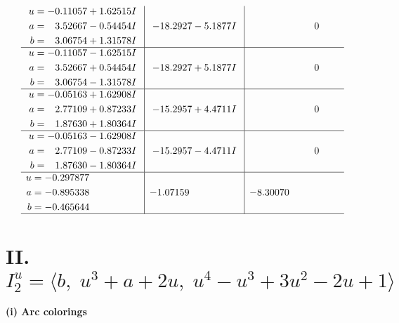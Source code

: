 \documentclass[1p]{elsarticle_modified}
\theoremstyle{definition}
\begin{document}
$$\begin{array}{c|c|c}
\begin{aligned}
u &= -0.11057 + 1.62515 I \\
a &= \phantom{-}3.52667 - 0.54454 I \\
b &= \phantom{-}3.06754 + 1.31578 I\end{aligned}
 & -18.2927 - 5.1877 I & \phantom{-0.000000 } 0 \\ \hline\begin{aligned}
u &= -0.11057 - 1.62515 I \\
a &= \phantom{-}3.52667 + 0.54454 I \\
b &= \phantom{-}3.06754 - 1.31578 I\end{aligned}
 & -18.2927 + 5.1877 I & \phantom{-0.000000 } 0 \\ \hline\begin{aligned}
u &= -0.05163 + 1.62908 I \\
a &= \phantom{-}2.77109 + 0.87233 I \\
b &= \phantom{-}1.87630 + 1.80364 I\end{aligned}
 & -15.2957 + 4.4711 I & \phantom{-0.000000 } 0 \\ \hline\begin{aligned}
u &= -0.05163 - 1.62908 I \\
a &= \phantom{-}2.77109 - 0.87233 I \\
b &= \phantom{-}1.87630 - 1.80364 I\end{aligned}
 & -15.2957 - 4.4711 I & \phantom{-0.000000 } 0 \\ \hline\begin{aligned}
u &= -0.297877\phantom{ +0.000000I} \\
a &= -0.895338\phantom{ +0.000000I} \\
b &= -0.465644\phantom{ +0.000000I}\end{aligned}
 & -1.07159\phantom{ +0.000000I} & -8.30070\phantom{ +0.000000I}\\
 \hline 
 \end{array}$$\newpage\newpage\renewcommand{\arraystretch}{1}
\centering \section*{II. $I^u_{2}= \langle b,\;u^3+a+2 u,\;u^4- u^3+3 u^2-2 u+1 \rangle$}
\flushleft \textbf{(i) Arc colorings}\\
\end{document}
